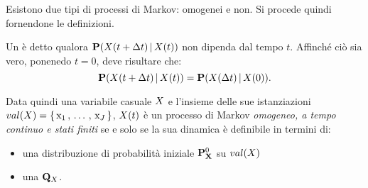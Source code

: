Esistono due tipi di processi di Markov: omogenei e non. Si procede quindi fornendone le definizioni.

\begin{definizione}[\upcase\mprocess*{} \omog*{}]
\label{defn:homogeneus-markov-process}
Un \mprocess*{} è detto \emph{\omog*{}} qualora $\mathbf{P}(\mathnormal{X}(t + \Delta t)\,\arrowvert\,\mathnormal{X}(t))$ non dipenda dal tempo $t$. Affinché ciò sia vero, ponenedo $t=0$, deve risultare che:
\begin{equation}
\label{eq:homogeneus-markov-process}
\mathbf{P}(\mathnormal{X}(t + \Delta t)\,\arrowvert\,\mathnormal{X}(t))=\mathbf{P}(\mathnormal{X}(\Delta t)\,\arrowvert\,\mathnormal{X}(0))\text{.}
\end{equation}
\end{definizione}
Data quindi una variabile casuale $\mathnormal{X}$ e l'insieme delle sue istanziazioni $val(\mathnormal{X})=\{\,\mathrm{x}_1\,,\,\dotsc\,,\,\mathrm{x}_J\,\}$, $\mathnormal{X}(t)$ è un processo di Markov \emph{omogeneo, a tempo continuo e stati finiti} se e solo se la sua dinamica è definibile in termini di:
\begin{itemize}
    \item una distribuzione di probabilità iniziale $\mathbf{P}^0_{\mathbf{X}}$ su $val(\mathnormal{X})$
    \item una \im*{} $\mathbf{Q}_{\mathnormal{X}}$.
\end{itemize}

